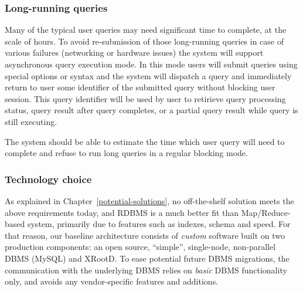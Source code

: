 \documentclass[DM,lsstdraft,toc]{lsstdoc}
\begin{document}
\subsubsection{Long-running queries}\label{long-running-queries}

Many of the typical user queries may need significant time to complete,
at the scale of hours. To avoid re-submission of those long-running
queries in case of various failures (networking or hardware issues) the
system will support asynchronous query execution mode. In this mode
users will submit queries using special options or syntax and the system
will dispatch a query and immediately return to user some identifier of
the submitted query without blocking user session. This query identifier
will be used by user to retirieve query processing status, query result
after query completes, or a partial query result while query is still
executing.

The system should be able to estimate the time which user query will
need to complete and refuse to run long queries in a regular blocking
mode.

\subsubsection{Technology choice}\label{technology-choice}

As explained in Chapter~\ref{potential-solutions},
no off-the-shelf solution meets the above requirements today, and RDBMS
is a much better fit than Map/Reduce-based system, primarily due to
features such as indexes, schema and speed. For that reason, our
baseline architecture consists of \emph{custom} software built on two
production components: an open source, ``simple'', single-node,
non-parallel DBMS (MySQL) and XRootD. To ease
potential future DBMS migrations, the communication with the underlying
DBMS relies on \emph{basic} DBMS functionality only, and avoids any
vendor-specific features and additions.
\end{document}

